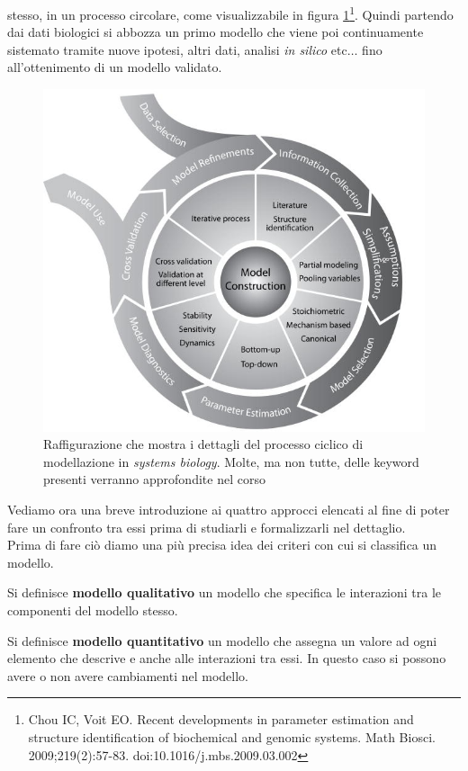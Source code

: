 \documentclass[a4paper,12pt, oneside]{book}
\begin{document}
stesso, in un processo circolare, come visualizzabile in figura
\ref{fig:cyc}\footnote{Chou IC, Voit EO. Recent developments in parameter
  estimation and structure identification of biochemical and genomic
  systems. Math
  Biosci. 2009;219(2):57-83. doi:10.1016/j.mbs.2009.03.002}. Quindi partendo dai
dati biologici si abbozza un primo modello che viene poi continuamente sistemato
tramite nuove ipotesi, altri dati, analisi \textit{in silico} etc$\ldots$ fino
all'ottenimento di un modello validato.
\begin{figure}
  \centering
  \includegraphics[scale = 0.8]{img/cycle.jpg}
  \caption{Raffigurazione che mostra i dettagli del processo ciclico di
    modellazione in \textit{systems biology}. Molte, ma non tutte, delle keyword
    presenti verranno approfondite nel corso}
  \label{fig:cyc}
\end{figure}
Vediamo ora una breve introduzione ai quattro approcci elencati al fine di poter
fare un confronto tra essi prima di studiarli e formalizzarli nel dettaglio.\\
Prima di fare ciò diamo una più precisa idea dei criteri con cui si classifica
un modello.
\begin{definizione}
  Si definisce \textbf{modello qualitativo} un modello che specifica le
  interazioni tra le componenti del modello stesso.
\end{definizione}
\begin{definizione}
  Si definisce \textbf{modello quantitativo} un modello che assegna un valore ad
  ogni elemento che descrive e anche alle interazioni tra essi. In questo caso
  si possono avere o non avere cambiamenti nel modello.
\end{definizione}
\end{document}
